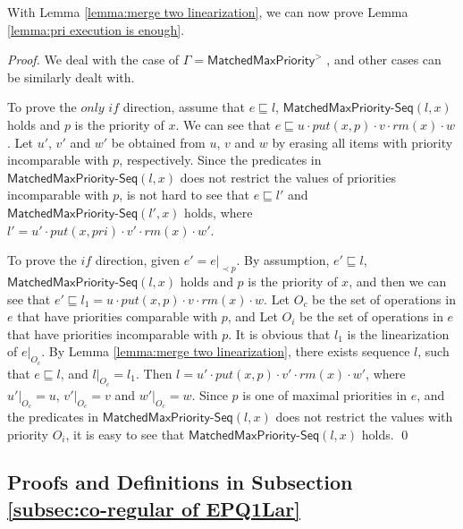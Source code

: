 With Lemma \ref{lemma:merge two linearization}, we can now prove Lemma \ref{lemma:pri execution is enough}.

\priExecutionIsEnough*
\begin {proof}

We deal with the case of $\Gamma = \mathsf{MatchedMaxPriority}^{>}$ , and other cases can be similarly dealt with.

To prove the $\textit{only if}$ direction, assume that $e \sqsubseteq l$, $\mathsf{MatchedMaxPriority\text{-}Seq}(l,x)$ holds and $p$ is the priority of $x$. We can see that $e \sqsubseteq u \cdot \textit{put}(x,p) \cdot v \cdot \textit{rm}(x) \cdot w$. Let $u'$, $v'$ and $w'$ be obtained from $u$, $v$ and $w$ by erasing all items with priority incomparable with $p$, respectively. Since the predicates in $\mathsf{MatchedMaxPriority\text{-}Seq}(l,x)$ does not restrict the values of priorities incomparable with $p$, is not hard to see that $e \sqsubseteq l'$ and $\mathsf{MatchedMaxPriority\text{-}Seq}(l',x)$ holds, where $l' = u' \cdot \textit{put}(x,\textit{pri}) \cdot v' \cdot \textit{rm}(x) \cdot w'$.

To prove the $\textit{if}$ direction, given $e' = e \vert_{\prec p}$. By assumption, $e' \sqsubseteq l$, $\mathsf{MatchedMaxPriority\text{-}Seq}(l,x)$ holds and $p$ is the priority of $x$, and then we can see that $e' \sqsubseteq l_1 = u \cdot \textit{put}(x,p) \cdot v \cdot \textit{rm}(x) \cdot w$. Let $O_c$ be the set of operations in $e$ that have priorities comparable with $p$, and Let $O_i$ be the set of operations in $e$ that have priorities incomparable with $p$. It is obvious that $l_1$ is the linearization of $e \vert_{O_c}$. By Lemma \ref{lemma:merge two linearization}, there exists sequence $l$, such that $e \sqsubseteq l$, and $l \vert_{O_c} = l_1$. Then $l = u' \cdot \textit{put}(x,p) \cdot v' \cdot \textit{rm}(x) \cdot w'$, where $u' \vert_{O_c} = u$, $v' \vert_{O_c} = v$ and $w' \vert_{O_c} = w$. Since $p$ is one of maximal priorities in $e$, and the predicates in $\mathsf{MatchedMaxPriority\text{-}Seq}(l,x)$ does not restrict the values with priority $O_i$, it is easy to see that $\mathsf{MatchedMaxPriority\text{-}Seq}(l,x)$ holds. \qed
\end {proof}



\subsection{Proofs and Definitions in Subsection \ref{subsec:co-regular of EPQ1Lar}}
\label{sec:appendix proof and definition in section co-regular of EPQ1Lar}


